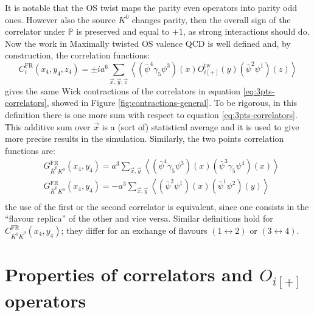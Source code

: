 \documentclass[english, LaM, oneside, noexaminfo]{sapthesis}
\newcommand{\la}{\langle}
\newcommand{\ra}{\rangle}
\begin{document}
It is notable that the OS twist maps the parity even operators into parity odd ones.
However also the source $K^{0}$ changes parity, then the overall sign of the correlator under $\mathbb{P}$ is preserved and equal to $+1$, as strong interactions should do.
Now the work in Maximally twisted OS valence QCD is well defined and, by construction, the correlation functions:
\begin{equation}\label{eq:lattice-correlators}
    C_i^\text{FR}(x_4,y_4,z_4) = \pm i a^6 \sum_{\vec x, \vec y, \vec z}\left\la \left(\bar\psi^4 \gamma_5 \psi^3 \right) (x) O_{i[+]}^\text{tw} (y) \left(\bar\psi^2 \psi^1 \right) (z)\right\ra
\end{equation}
gives the same Wick contractions of the correlators in equation \ref{eq:3pts-correlators}, showed in Figure \ref{fig:contractions-general}.
To be rigorous, in this definition there is one more sum with respect to equation \ref{eq:3pts-correlators}.
This additive sum over $\vec x$ is a (sort of) statistical average and it is used to give more precise results in the simulation.
Similarly, the two points correlation functions are:
\begin{equation}\label{eq:lattice-propagators}
    \begin{split}
        & G_{\bar K^0 K^0}^\text{FR}(x_4,y_4) = a^3 \sum_{\vec x, \vec y} \left\la \left(\bar\psi^4 \gamma_5 \psi^3 \right) (x) \left(\bar\psi^3 \gamma_5 \psi^4 \right) (x) \right\ra \\
        & G_{\bar K^0 K^0}^\text{FR}(x_4,y_4) = - a^3 \sum_{\vec x, \vec y} \left\la \left(\bar\psi^2 \psi^1 \right) (x) \left(\bar\psi^1 \psi^2 \right) (y) \right\ra \\
    \end{split}
\end{equation}
the use of the first or the second correlator is equivalent, since one consists in the ``flavour replica'' of the other and vice versa.
Similar definitions hold for $C_{K^0 \bar K^0 }^\text{FR}(x_4,y_4)$; they differ for an exchange of flavours $(1\leftrightarrow 2)$ or $(3\leftrightarrow 4)$.


\section{Properties of correlators and $O_{i[+]}$ operators}\label{sec:operators-properties}
\end{document}
